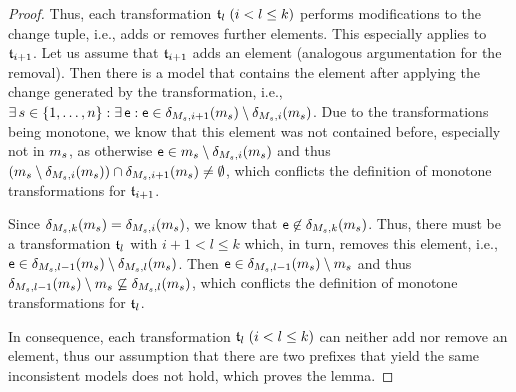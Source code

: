 \begin{proof}
    Thus, each transformation $\transformation{t}_{l} \; (i < l \leq k)$ performs modifications to the change tuple, i.e., adds or removes further elements.
    This especially applies to $\transformation{t}_{i+1}$.
    Let us assume that $\transformation{t}_{i+1}$ adds an element (analogous argumentation for the removal).
    Then there is a model that contains the element after applying the change generated by the transformation, i.e., $\exists s \in \setted{1, \dots, n} : \exists \modelelement{e} : \modelelement{e} \in \change{\metamodel{M}{s},i+1}(\model{m}{s}) \setminus \change{\metamodel{M}{s},i}(\model{m}{s})$.
    Due to the transformations being monotone, we know that this element was not contained before, especially not in $\model{m}{s}$, as otherwise $\modelelement{e} \in \model{m}{s} \setminus \change{\metamodel{M}{s},i}(\model{m}{s})$ and thus $(\model{m}{s} \setminus \change{\metamodel{M}{s},i}(\model{m}{s})) \cap \change{\metamodel{M}{s},i+1}(\model{m}{s}) \neq \emptyset$, which conflicts the definition of monotone transformations for $\transformation{t}_{i+1}$.

    Since $\change{\metamodel{M}{s},k}(\model{m}{s}) = \change{\metamodel{M}{s},i}(\model{m}{s})$, we know that $\modelelement{e} \not\in \change{\metamodel{M}{s},k}(\model{m}{s})$.
    Thus, there must be a transformation $\transformation{t}_{l}$ with $i+1 < l \leq k$ which, in turn, removes this element, i.e., $\modelelement{e} \in \change{\metamodel{M}{s},l-1}(\model{m}{s}) \setminus \change{\metamodel{M}{s},l}(\model{m}{s})$.
    Then $\modelelement{e} \in \change{\metamodel{M}{s},l-1}(\model{m}{s}) \setminus \model{m}{s}$ and thus $\change{\metamodel{M}{s},l-1}(\model{m}{s}) \setminus \model{m}{s} \not\subseteq \change{\metamodel{M}{s},l}(\model{m}{s})$, which conflicts the definition of monotone transformations for $\transformation{t}_{l}$.

    In consequence, each transformation $\transformation{t}_{l} \; (i < l \leq k)$ can neither add nor remove an element, thus our assumption that there are two prefixes that yield the same inconsistent models does not hold, which proves the lemma.
\end{proof}

